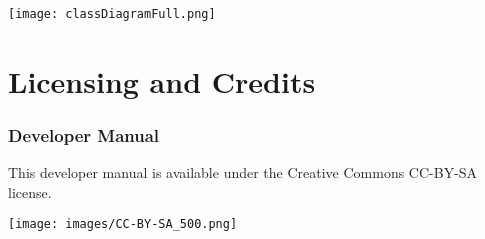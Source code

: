 \newpage
\begin{landscape}
\begin{changemargin}{-2.cm}{-3cm}
\thispagestyle{empty}
\texttt{[image: classDiagramFull.png]}
\end{changemargin}
\end{landscape}
\newpage


\chapter{Licensing and Credits}


\subsection*{Developer Manual}
This developer manual is available under the Creative Commons CC-BY-SA license.

\begin{center}
	\texttt{[image: images/CC-BY-SA\_500.png]}
\end{center}











